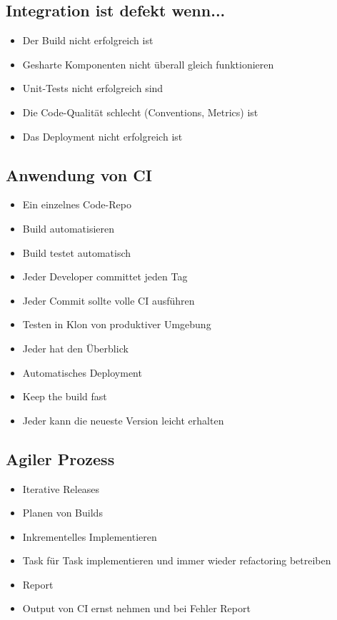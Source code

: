 \documentclass[a4paper,10pt]{article}
\begin{document}
\subsection{Integration ist defekt wenn...}
\begin{itemize}
 \item Der Build nicht erfolgreich ist
 \item Gesharte Komponenten nicht überall gleich funktionieren 
 \item Unit-Tests nicht erfolgreich sind
 \item Die Code-Qualität schlecht (Conventions, Metrics) ist
 \item Das Deployment nicht erfolgreich ist
\end{itemize}

\subsection{Anwendung von CI}
\begin{itemize}
 \item Ein einzelnes Code-Repo
 \item Build automatisieren
 \item Build testet automatisch
 \item Jeder Developer committet jeden Tag
 \item Jeder Commit sollte volle CI ausführen
 \item Testen in Klon von produktiver Umgebung
 \item Jeder hat den Überblick
 \item Automatisches Deployment
 \item Keep the build fast
 \item Jeder kann die neueste Version leicht erhalten
\end{itemize}

\subsection{Agiler Prozess}
\begin{itemize}
 \item Iterative Releases
 \item Planen von Builds
 \item Inkrementelles Implementieren
 \item Task für Task implementieren und immer wieder refactoring betreiben
 \item Report
 \item Output von CI ernst nehmen und bei Fehler Report
\end{itemize}
\end{document}
